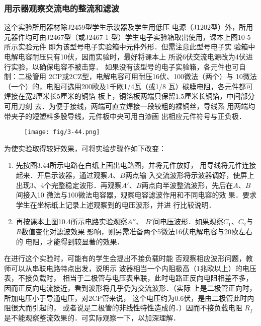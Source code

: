 \subsubsection{用示器观察交流电的整流和滤波}
这个实验所用器材除J2459型学生示波器及学生用低压
电源（J1202型）外，所用元器件均可由J2467型（或J2467-1
型）学生电子实验箱取出使用，课本上图10-5所示实验元件
即为该型号电子实验箱中元件外形．但需注意此型号电子实
验箱中电解电容耐压只有10伏，因而实验时，最好将课本上
所说6伏交流电源改为4伏进行实验，以确保电容不被击穿．
如果没有该型号的电子实验箱，各元件也可自制：二极管用
2CP或2CZ型，电解电容可用耐压16伏、100微法（两个）与
10微法（一个）的，电阻可选用200欧及1千欧1/4瓦（或1/8
瓦）碳膜电阻，各元件都可焊接在宽2厘米长5厘米的铜箔
板上，铜箔板两端只保留1.5厘米长铜箔，中间部分可用刀刻
去．为便于接线，两端可直立焊接一段较粗的裸铜丝，导线系
用两端均带夹子的短塑料多股导线，元件板中央可用白漆画
出相应元件符号与正负极．

\begin{figure}[htp]
    \centering
\texttt{[image: fig/3-44.png]}
    \caption{}
\end{figure}

为使实验取得较好效果，可将实验步骤作如下改变：
\begin{enumerate}
    \item 先按图3.44所示电路在白纸上画出电路图，并将元件放好，
用导线将元件连接起来．开启示波器，通过观察$A$、$B$两点输
入交流波形将示波器调好，使屏上出现3、4个完整稳定波形．再观察$A'$、$B$两点向半波整流波形，先后在$A$、$B$间接入10
微法与100微法电容器，观察电容滤波作用和不同电容的效
果．要求学生在坐标纸上记录上述观察到的电压波形，并进
行比较说明．
\item 再按课本上图10.4所示电路实验观察$A''$、
$B'$间电压波形．如果观察$C_1$、$C_2$与$R$数值变化对滤波效果
影响，则另需准备两个5微法16伏电解电容与20欧左右的
电阻，才能得到较显著的效果．
\end{enumerate}

在进行这个实验时，可能有的学生会提出不接负载时能
否观察相应波形问题，教师可以从串联电路特点出发，说明示
波器相当一个内阻极高（1兆欧以上）的电压表，不接负载时，
相当于二极管与电压表串联，此时电路正反向电阻相差不多，
因而正反向电流接近，看到波形将几乎仍为交流波形．（实际
上是二极管正向时，所加电压小于导通电压，对2CP管来说，
这个电压约为0.6伏，是由二极管此时内阻很大而引起的，
或者说是二极管的非线性特性造成的．）因而不接负载电阻
$R_f$是不能观察整流效果的．可实际观察一下，以加深理解．

